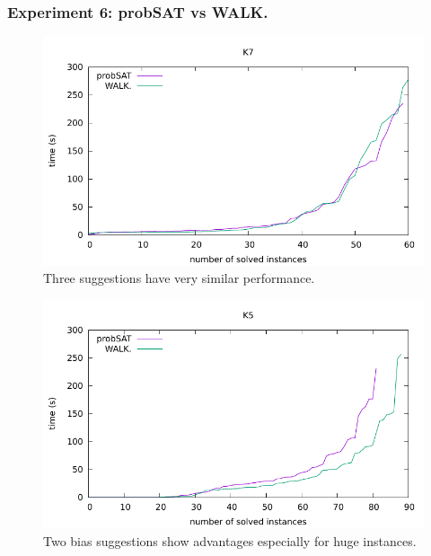 \documentclass[12pt,a4paper,twoside]{scrartcl}
\numberwithin{equation}{section}
\begin{document}
\subsubsection{Experiment 6: probSAT vs WALK.} 
\label{sec:Experiment 6} 
  \begin{figure}[H]
\begin{center}
  \includegraphics[scale = 1]{DATA/K7/e4w.pdf}
  \end{center}
  \caption{Three suggestions have very similar performance.}
  \label{Experiment 6 k3 cactus plot}
  \end{figure}
  \begin{figure}[H]
\begin{center}
  \includegraphics[scale = 1]{DATA/K5/e4w.pdf}
  \end{center}
  \caption{Two bias suggestions show advantages especially for huge instances.}
  \label{Experiment 6 k5 cactus plot}
  \end{figure}
\end{document}
